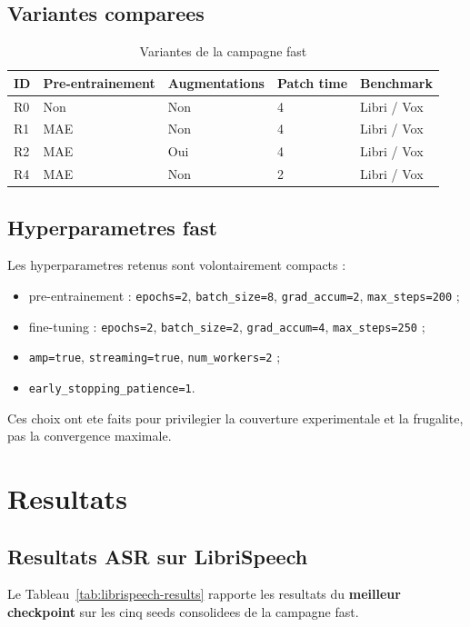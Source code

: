 \documentclass[11pt,a4paper]{article}
\begin{document}
\subsection{Variantes comparees}
\begin{table}[H]
\centering
\caption{Variantes de la campagne fast}
\begin{tabular}{lllll}
\toprule
ID & Pre-entrainement & Augmentations & Patch time & Benchmark \\
\midrule
R0 & Non & Non & 4 & Libri / Vox \\
R1 & MAE & Non & 4 & Libri / Vox \\
R2 & MAE & Oui & 4 & Libri / Vox \\
R4 & MAE & Non & 2 & Libri / Vox \\
\bottomrule
\end{tabular}
\end{table}

\subsection{Hyperparametres fast}
Les hyperparametres retenus sont volontairement compacts :
\begin{itemize}[leftmargin=1.2cm]
\item pre-entrainement : \texttt{epochs=2}, \texttt{batch\_size=8}, \texttt{grad\_accum=2}, \texttt{max\_steps=200} ;
\item fine-tuning : \texttt{epochs=2}, \texttt{batch\_size=2}, \texttt{grad\_accum=4}, \texttt{max\_steps=250} ;
\item \texttt{amp=true}, \texttt{streaming=true}, \texttt{num\_workers=2} ;
\item \texttt{early\_stopping\_patience=1}.
\end{itemize}

Ces choix ont ete faits pour privilegier la couverture experimentale et la frugalite, pas la convergence maximale.

\section{Resultats}
\subsection{Resultats ASR sur LibriSpeech}
Le Tableau~\ref{tab:librispeech-results} rapporte les resultats du \textbf{meilleur checkpoint} sur les cinq seeds consolidees de la campagne fast.
\end{document}
